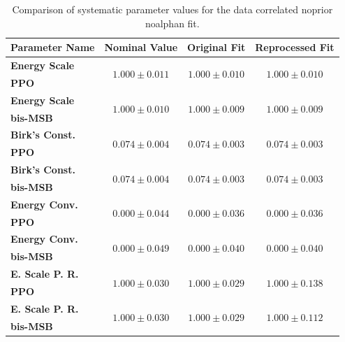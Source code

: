\begin{table}
    \small
    \centering
    \caption{Comparison of systematic parameter values for the data correlated noprior noalphan fit.}
    \label{tab:data_correlated_noprior_noalphan_syst_old_new}
    \begin{tabular}{lccc}
        \hline\hline
        \textbf{Parameter Name} & \textbf{Nominal Value} & \textbf{Original Fit} & \textbf{Reprocessed Fit} \\
        \hline

        \textbf{Energy Scale} & \multirow{2}{*}{$1.000\pm0.011$} & \multirow{2}{*}{$1.000\pm0.010$} & \multirow{2}{*}{$1.000\pm0.010$} \\
        \textbf{PPO} & & & \\
        \hline

        \textbf{Energy Scale} & \multirow{2}{*}{$1.000\pm0.010$} & \multirow{2}{*}{$1.000\pm0.009$} & \multirow{2}{*}{$1.000\pm0.009$} \\
        \textbf{bis-MSB} & & & \\
        \hline

        \textbf{Birk's Const.} & \multirow{2}{*}{$0.074\pm0.004$} & \multirow{2}{*}{$0.074\pm0.003$} & \multirow{2}{*}{$0.074\pm0.003$} \\
        \textbf{PPO} & & & \\
        \hline

        \textbf{Birk's Const.} & \multirow{2}{*}{$0.074\pm0.004$} & \multirow{2}{*}{$0.074\pm0.003$} & \multirow{2}{*}{$0.074\pm0.003$} \\
        \textbf{bis-MSB} & & & \\
        \hline

        \textbf{Energy Conv.} & \multirow{2}{*}{$0.000\pm0.044$} & \multirow{2}{*}{$0.000\pm0.036$} & \multirow{2}{*}{$0.000\pm0.036$} \\
        \textbf{PPO} & & & \\
        \hline

        \textbf{Energy Conv.} & \multirow{2}{*}{$0.000\pm0.049$} & \multirow{2}{*}{$0.000\pm0.040$} & \multirow{2}{*}{$0.000\pm0.040$} \\
        \textbf{bis-MSB} & & & \\
        \hline

        \textbf{E. Scale P. R.} & \multirow{2}{*}{$1.000\pm0.030$} & \multirow{2}{*}{$1.000\pm0.029$} & \multirow{2}{*}{$1.000\pm0.138$} \\
        \textbf{PPO} & & & \\
        \hline

        \textbf{E. Scale P. R.} & \multirow{2}{*}{$1.000\pm0.030$} & \multirow{2}{*}{$1.000\pm0.029$} & \multirow{2}{*}{$1.000\pm0.112$} \\
        \textbf{bis-MSB} & & & \\
        \hline

        \hline\hline
    \end{tabular}
\end{table}
